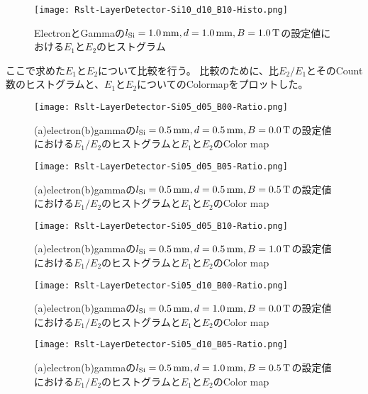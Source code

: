 \documentclass[a4paper,10pt]{jreport}
\begin{document}
\begin{figure}[H]
	\center
	\texttt{[image: Rslt-LayerDetector-Si10\_d10\_B10-Histo.png]}
	\caption{ElectronとGammaの$l_{\rm{Si}}=\SI{1.0}{mm}, d=\SI{1.0}{mm}, B=\SI{1.0}{T}$の設定値における$E_1$と$E_2$のヒストグラム}
	\label{Rslt-LayerDetector-Si05_d05_B00-Histo}
\end{figure}

ここで求めた$E_1$と$E_2$について比較を行う。
比較のために、比$E_2/E_1$とそのCount数のヒストグラムと、$E_1$と$E_2$についてのColormapをプロットした。

\begin{figure}[H]
	\center
	\texttt{[image: Rslt-LayerDetector-Si05\_d05\_B00-Ratio.png]}
	\caption{(a)electron(b)gammaの$l_{\rm{Si}}=\SI{0.5}{mm}, d=\SI{0.5}{mm}, B=\SI{0.0}{T}$の設定値における$E_1/E_2$のヒストグラムと$E_1$と$E_2$のColor map}
	\label{Rslt-LayerDetector-Si05_d05_B00-Ratio}
\end{figure}

\begin{figure}[H]
	\center
	\texttt{[image: Rslt-LayerDetector-Si05\_d05\_B05-Ratio.png]}
	\caption{(a)electron(b)gammaの$l_{\rm{Si}}=\SI{0.5}{mm}, d=\SI{0.5}{mm}, B=\SI{0.5}{T}$の設定値における$E_1/E_2$のヒストグラムと$E_1$と$E_2$のColor map}
	\label{Rslt-LayerDetector-Si05_d05_B05-Ratio}
\end{figure}

\begin{figure}[H]
	\center
	\texttt{[image: Rslt-LayerDetector-Si05\_d05\_B10-Ratio.png]}
	\caption{(a)electron(b)gammaの$l_{\rm{Si}}=\SI{0.5}{mm}, d=\SI{0.5}{mm}, B=\SI{1.0}{T}$の設定値における$E_1/E_2$のヒストグラムと$E_1$と$E_2$のColor map}
	\label{Rslt-LayerDetector-Si05_d05_B10-Ratio}
\end{figure}

\begin{figure}[H]
	\center
	\texttt{[image: Rslt-LayerDetector-Si05\_d10\_B00-Ratio.png]}
	\caption{(a)electron(b)gammaの$l_{\rm{Si}}=\SI{0.5}{mm}, d=\SI{1.0}{mm}, B=\SI{0.0}{T}$の設定値における$E_1/E_2$のヒストグラムと$E_1$と$E_2$のColor map}
	\label{Rslt-LayerDetector-Si05_d10_B00-Ratio}
\end{figure}

\begin{figure}[H]
	\center
	\texttt{[image: Rslt-LayerDetector-Si05\_d10\_B05-Ratio.png]}
	\caption{(a)electron(b)gammaの$l_{\rm{Si}}=\SI{0.5}{mm}, d=\SI{1.0}{mm}, B=\SI{0.5}{T}$の設定値における$E_1/E_2$のヒストグラムと$E_1$と$E_2$のColor map}
	\label{Rslt-LayerDetector-Si05_d10_B05-Ratioo}
\end{figure}
\end{document}
